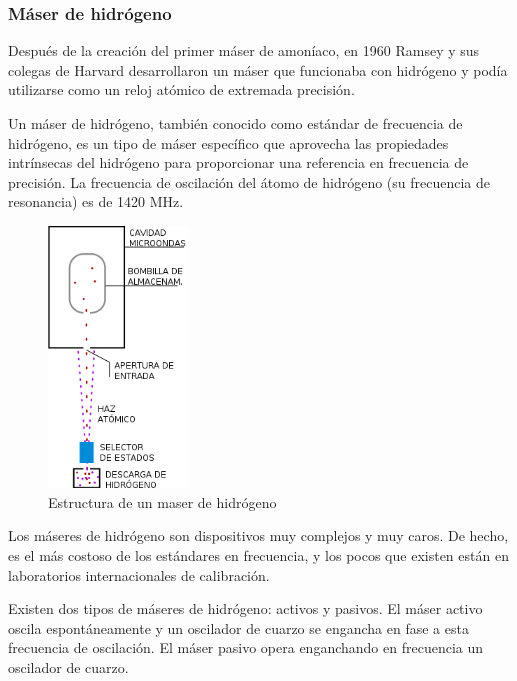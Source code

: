 \subsubsection{M\'aser de hidr\'ogeno}
\label{tipo:hidrogeno}

Despu\'es de la creaci\'on del primer m\'aser de amon\'iaco, en 1960 Ramsey y sus colegas de Harvard desarrollaron un máser que funcionaba con hidrógeno y podía utilizarse como un reloj atómico de extremada precisión.

Un m\'aser de hidr\'ogeno, tambi\'en conocido como est\'andar de frecuencia de hidr\'ogeno, es un tipo de m\'aser espec\'ifico que aprovecha las propiedades intr\'insecas del hidr\'ogeno para proporcionar una referencia en frecuencia de precisi\'on. La frecuencia de oscilaci\'on del \'atomo de hidr\'ogeno (su frecuencia de resonancia) es de 1420 MHz.

\begin{figure}[ht!]
 \centering
 \includegraphics[width=0.33\textwidth]{./Utils/maser_hidrogeno.png}
 \caption{Estructura de un maser de hidrógeno}
 \label{fig:maser_hidrogeno}
\end{figure}

Los m\'aseres de hidr\'ogeno son dispositivos muy complejos y muy caros. De hecho, es el más costoso de los estándares en frecuencia, y los pocos que existen están en laboratorios internacionales de calibración.

Existen dos tipos de m\'aseres de hidr\'ogeno: activos y pasivos. El m\'aser activo oscila espont\'aneamente y un oscilador de cuarzo se engancha en fase a esta frecuencia de oscilaci\'on. El m\'aser pasivo opera enganchando en frecuencia un oscilador de cuarzo. 



